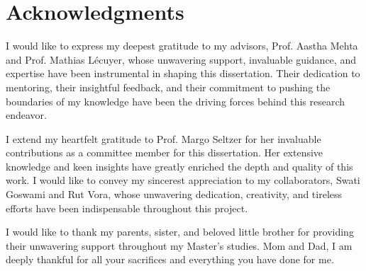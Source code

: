 
\chapter{Acknowledgments}

I would like to express my deepest gratitude to my advisors, Prof. Aastha Mehta and Prof. Mathias L\'{e}cuyer, whose unwavering support, invaluable guidance, and expertise have been instrumental in shaping this dissertation.
Their dedication to mentoring, their insightful feedback, and their commitment to pushing the boundaries of my knowledge have been the driving forces behind this research endeavor. 

I extend my heartfelt gratitude to Prof. Margo Seltzer for her invaluable contributions as a committee member for this dissertation.
Her extensive knowledge and keen insights have greatly enriched the depth and quality of this work.
I would like to convey my sincerest appreciation to my collaborators, Swati Goswami and Rut Vora, whose unwavering dedication, creativity, and tireless efforts have been indispensable throughout this project.

I would like to thank my parents, sister, and beloved little brother for providing their unwavering support throughout my Master's studies. Mom and Dad, I am deeply thankful for all your sacrifices and everything you have done for me.  